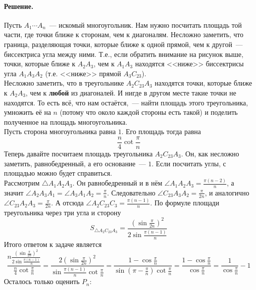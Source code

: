 \documentclass{article}
\begin{document}
    \paragraph{Решение.}
    \begin{figure}[H]
        
    \end{figure}
    Пусть $A_1\cdots A_n$~--- искомый многоугольник. Нам нужно посчитать площадь той части, где точки ближе к сторонам, чем к диагоналям. Несложно заметить, что граница, разделяющая точки, которые ближе к одной прямой, чем к другой~--- биссектриса угла между ними. Т.е., если обратить внимание на рисунок выше, точки, которые ближе к $A_2A_3$, чем к $A_1A_3$ находятся <<ниже>> биссектрисы угла $A_1A_3A_2$ (т.е. <<ниже>> прямой $A_3C_{23}$).\\
    Несложно заметить, что в треугольнике $A_2C_{23}A_3$ находятся точки, которые ближе к $A_2A_3$, чем к \textbf{любой} из диагоналей. И нигде в другом месте такие точки не находятся. То есть всё, что нам остаётся,~--- найти площадь этого треугольника, умножить её на $n$ (потому что около каждой стороны есть такой) и поделить полученное на площадь многоугольника.\\
    Пусть сторона многоугольника равна $1$. Его площадь тогда равна
    $$
    \frac n4\cot\frac\pi n
    $$
    Теперь давайте посчитаем площадь треугольника $A_2C_{23}A_3$. Он, как несложно заметить, равнобедренный, а его основание~--- $1$. Если посчитать углы, с площадью можно будет справиться.\\
    Рассмотрим $\triangle A_1A_2A_3$. Он равнобедренный и в нём $\angle A_1A_2A_3=\frac{\pi(n-2)}n$, а значит $\angle A_2A_3A_1=\angle A_3A_1A_2=\frac\pi n$. Следовательно $\angle C_{23}A_3A_2=\frac{\pi}{2n}$, и аналогично $\angle C_{23}A_2A_3=\frac{\pi}{2n}$. А отсюда $\angle A_2C_{23}C_3=\frac{\pi(n-1)}n$. По формуле площади треугольника через три угла и сторону
    $$
    S_{\triangle A_2C_{23}A_3}=\frac{\left(\sin\frac{\pi}{2n}\right)^2}{2\sin\frac{\pi(n-1)}n}
    $$
    Итого ответом к задаче является
    $$
    \frac{n\frac{\left(\sin\frac{\pi}{2n}\right)^2}{2\sin\frac{\pi(n-1)}n}}{\frac n4\cot\frac\pi n}=\frac{2\left(\sin\frac{\pi}{2n}\right)^2}{\sin\frac{\pi(n-1)}n\cot\frac\pi n}=\frac{1-\cos\frac\pi n}{\sin\left(\pi-\frac\pi n\right)\cot\frac\pi n}=\frac{1-\cos\frac\pi n}{\cos\frac\pi n}=\frac1{\cos\frac\pi n}-1
    $$
    Осталось только оценить $P_n$:
\end{document}
